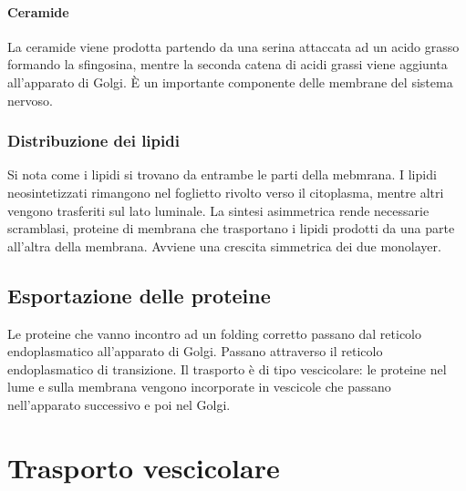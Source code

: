 			\paragraph{Ceramide}
			La ceramide viene prodotta partendo da una serina attaccata ad un acido grasso formando la sfingosina, mentre la seconda catena di acidi grassi viene aggiunta all'apparato di Golgi.
			\`E un importante componente delle membrane del sistema nervoso.

		\subsubsection{Distribuzione dei lipidi}
		Si nota come i lipidi si trovano da entrambe le parti della mebmrana.
		I lipidi neosintetizzati rimangono nel foglietto rivolto verso il citoplasma, mentre altri vengono trasferiti sul lato luminale.
		La sintesi asimmetrica rende necessarie scramblasi, proteine di membrana che trasportano i lipidi prodotti da una parte all'altra della membrana.
		Avviene una crescita simmetrica dei due monolayer.

	\subsection{Esportazione delle proteine}
	Le proteine che vanno incontro ad un folding corretto passano dal reticolo endoplasmatico all'apparato di Golgi.
	Passano attraverso il reticolo endoplasmatico di transizione.
	Il trasporto \`e di tipo vescicolare: le proteine nel lume e sulla membrana vengono incorporate in vescicole che passano nell'apparato successivo e poi nel Golgi.

\section{Trasporto vescicolare}

